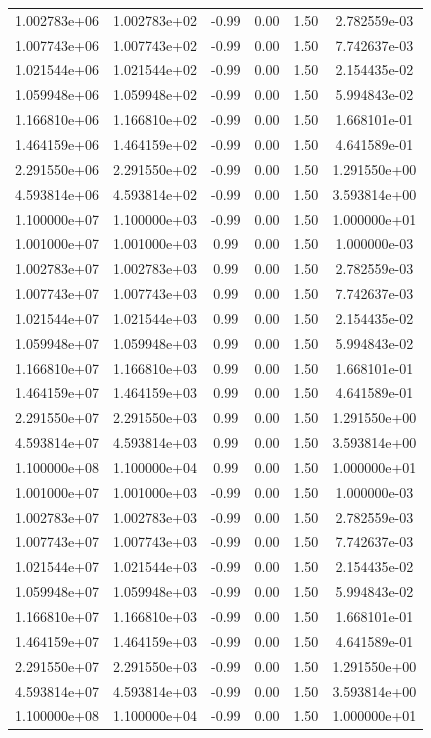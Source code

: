 \documentclass{article}
\begin{document}
\begin{table}[htbp]
\begin{tabular}{cccccc}
1.002783e+06 & 1.002783e+02 & -0.99 & 0.00 & 1.50 & 2.782559e-03 \\
1.007743e+06 & 1.007743e+02 & -0.99 & 0.00 & 1.50 & 7.742637e-03 \\
1.021544e+06 & 1.021544e+02 & -0.99 & 0.00 & 1.50 & 2.154435e-02 \\
1.059948e+06 & 1.059948e+02 & -0.99 & 0.00 & 1.50 & 5.994843e-02 \\
1.166810e+06 & 1.166810e+02 & -0.99 & 0.00 & 1.50 & 1.668101e-01 \\
1.464159e+06 & 1.464159e+02 & -0.99 & 0.00 & 1.50 & 4.641589e-01 \\
2.291550e+06 & 2.291550e+02 & -0.99 & 0.00 & 1.50 & 1.291550e+00 \\
4.593814e+06 & 4.593814e+02 & -0.99 & 0.00 & 1.50 & 3.593814e+00 \\
1.100000e+07 & 1.100000e+03 & -0.99 & 0.00 & 1.50 & 1.000000e+01 \\
1.001000e+07 & 1.001000e+03 & 0.99 & 0.00 & 1.50 & 1.000000e-03 \\
1.002783e+07 & 1.002783e+03 & 0.99 & 0.00 & 1.50 & 2.782559e-03 \\
1.007743e+07 & 1.007743e+03 & 0.99 & 0.00 & 1.50 & 7.742637e-03 \\
1.021544e+07 & 1.021544e+03 & 0.99 & 0.00 & 1.50 & 2.154435e-02 \\
1.059948e+07 & 1.059948e+03 & 0.99 & 0.00 & 1.50 & 5.994843e-02 \\
1.166810e+07 & 1.166810e+03 & 0.99 & 0.00 & 1.50 & 1.668101e-01 \\
1.464159e+07 & 1.464159e+03 & 0.99 & 0.00 & 1.50 & 4.641589e-01 \\
2.291550e+07 & 2.291550e+03 & 0.99 & 0.00 & 1.50 & 1.291550e+00 \\
4.593814e+07 & 4.593814e+03 & 0.99 & 0.00 & 1.50 & 3.593814e+00 \\
1.100000e+08 & 1.100000e+04 & 0.99 & 0.00 & 1.50 & 1.000000e+01 \\
1.001000e+07 & 1.001000e+03 & -0.99 & 0.00 & 1.50 & 1.000000e-03 \\
1.002783e+07 & 1.002783e+03 & -0.99 & 0.00 & 1.50 & 2.782559e-03 \\
1.007743e+07 & 1.007743e+03 & -0.99 & 0.00 & 1.50 & 7.742637e-03 \\
1.021544e+07 & 1.021544e+03 & -0.99 & 0.00 & 1.50 & 2.154435e-02 \\
1.059948e+07 & 1.059948e+03 & -0.99 & 0.00 & 1.50 & 5.994843e-02 \\
1.166810e+07 & 1.166810e+03 & -0.99 & 0.00 & 1.50 & 1.668101e-01 \\
1.464159e+07 & 1.464159e+03 & -0.99 & 0.00 & 1.50 & 4.641589e-01 \\
2.291550e+07 & 2.291550e+03 & -0.99 & 0.00 & 1.50 & 1.291550e+00 \\
4.593814e+07 & 4.593814e+03 & -0.99 & 0.00 & 1.50 & 3.593814e+00 \\
1.100000e+08 & 1.100000e+04 & -0.99 & 0.00 & 1.50 & 1.000000e+01 \\
\hline
\end{tabular}
\end{table}
\end{document}

